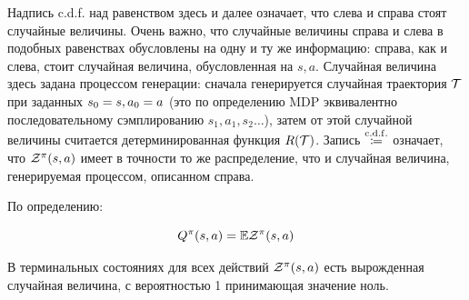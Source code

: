Надпись c.d.f. над равенством здесь и далее означает, что слева и справа стоят случайные величины. Очень важно, что случайные величины справа и слева в подобных равенствах обусловлены на одну и ту же информацию: справа, как и слева, стоит случайная величина, обусловленная на $s, a$. Случайная величина здесь задана процессом генерации: сначала генерируется случайная траектория $\mathcal{T}$ при заданных $s_0 \HM= s, a_0 \HM= a$ (это по определению MDP эквивалентно последовательному сэмплированию $s_1, a_1, s_2 \dots$), затем от этой случайной величины считается детерминированная функция $R(\mathcal{T})$. Запись $\mathrel{\stackrel{\mathrm{c.d.f.}}\coloneqq}$ означает, что $\mathcal{Z}^\pi(s, a)$ имеет в точности то же распределение, что и случайная величина, генерируемая процессом, описанном справа.

По определению:

\begin{proposition}
\begin{equation}\label{QZ}
Q^\pi(s, a) = \mathbb{E} \mathcal{Z}^\pi(s, a)
\end{equation}
\end{proposition}

\begin{proposition}
В терминальных состояниях для всех действий $\mathcal{Z}^{\pi}(s, a)$ есть вырожденная случайная величина, с вероятностью 1 принимающая значение ноль.
\end{proposition}

